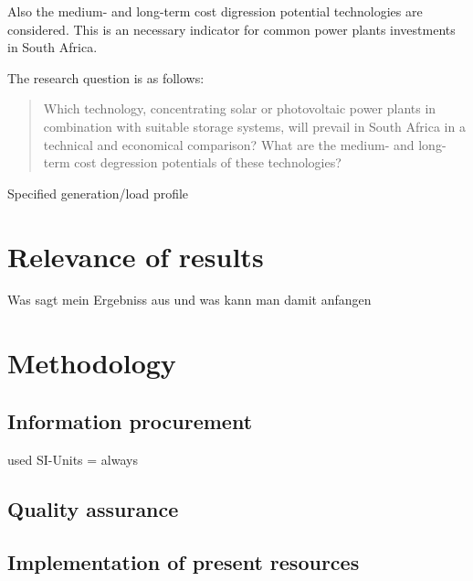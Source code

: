 Also the medium- and long-term cost digression potential technologies are considered. This is an necessary indicator for common power plants investments in South Africa.



The research question is as follows:
\begin{quote}
Which technology, concentrating solar or photovoltaic power plants in combination with suitable storage systems, will prevail in South Africa in a technical and economical comparison? What are the medium- and long-term cost degression potentials of these technologies?
\end{quote}


Specified generation/load profile 


\section{Relevance of results}
Was sagt mein Ergebniss aus und was kann man damit anfangen
\section{Methodology}

\subsection{Information procurement}
used SI-Units  = always 
\subsection{Quality assurance}

\subsection{Implementation of present resources}

\pagebreak

